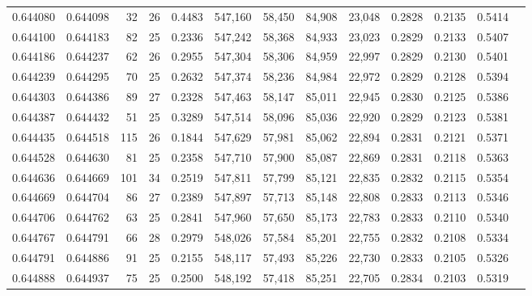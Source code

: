 \begin{tabular}{rrrrrrrrrrrrr}
0.644080 & 0.644098 &  32 &  26 &                                     0.4483 & 547,160 &  58,450 &  84,908 &  23,048 & 0.2828 & 0.2135 & 0.5414 \\
0.644100 & 0.644183 &  82 &  25 &                                     0.2336 & 547,242 &  58,368 &  84,933 &  23,023 & 0.2829 & 0.2133 & 0.5407 \\
0.644186 & 0.644237 &  62 &  26 &                                     0.2955 & 547,304 &  58,306 &  84,959 &  22,997 & 0.2829 & 0.2130 & 0.5401 \\
0.644239 & 0.644295 &  70 &  25 &                                     0.2632 & 547,374 &  58,236 &  84,984 &  22,972 & 0.2829 & 0.2128 & 0.5394 \\
0.644303 & 0.644386 &  89 &  27 &                                     0.2328 & 547,463 &  58,147 &  85,011 &  22,945 & 0.2830 & 0.2125 & 0.5386 \\
0.644387 & 0.644432 &  51 &  25 &                                     0.3289 & 547,514 &  58,096 &  85,036 &  22,920 & 0.2829 & 0.2123 & 0.5381 \\
0.644435 & 0.644518 & 115 &  26 &                                     0.1844 & 547,629 &  57,981 &  85,062 &  22,894 & 0.2831 & 0.2121 & 0.5371 \\
0.644528 & 0.644630 &  81 &  25 &                                     0.2358 & 547,710 &  57,900 &  85,087 &  22,869 & 0.2831 & 0.2118 & 0.5363 \\
0.644636 & 0.644669 & 101 &  34 &                                     0.2519 & 547,811 &  57,799 &  85,121 &  22,835 & 0.2832 & 0.2115 & 0.5354 \\
0.644669 & 0.644704 &  86 &  27 &                                     0.2389 & 547,897 &  57,713 &  85,148 &  22,808 & 0.2833 & 0.2113 & 0.5346 \\
0.644706 & 0.644762 &  63 &  25 &                                     0.2841 & 547,960 &  57,650 &  85,173 &  22,783 & 0.2833 & 0.2110 & 0.5340 \\
0.644767 & 0.644791 &  66 &  28 &                                     0.2979 & 548,026 &  57,584 &  85,201 &  22,755 & 0.2832 & 0.2108 & 0.5334 \\
0.644791 & 0.644886 &  91 &  25 &                                     0.2155 & 548,117 &  57,493 &  85,226 &  22,730 & 0.2833 & 0.2105 & 0.5326 \\
0.644888 & 0.644937 &  75 &  25 &                                     0.2500 & 548,192 &  57,418 &  85,251 &  22,705 & 0.2834 & 0.2103 & 0.5319 \\

\end{tabular}
